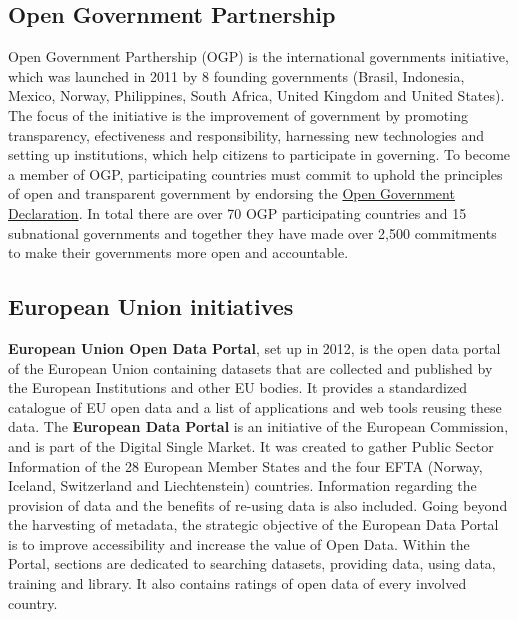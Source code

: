 \documentclass[thesis=B,english]{FITthesis}[2012/06/26]
\begin{document}
	\subsection{Open Government Partnership}
	Open Government Parthership (OGP) is the international governments initiative, which was launched in 2011 by 8 founding governments (Brasil, Indonesia, Mexico, Norway, Philippines, South Africa, United Kingdom and United States). The focus of the initiative is the improvement of government by promoting transparency, efectiveness and responsibility, harnessing new technologies and setting up institutions, which help citizens to participate in governing. To become a member of OGP, participating countries must commit to uphold the principles of open and transparent government by endorsing the \href{https://www.opengovpartnership.org/open-government-declaration}{Open Government Declaration}. In total there are over 70 OGP participating countries and 15 subnational governments and together they have made over 2,500 commitments to make their governments more open and accountable. \cite{opengovernmentpartnership}
	
	\subsection{European Union initiatives}
\textbf{European Union Open Data Portal}, set up in 2012, is the open data portal of the European Union containing datasets that are collected and published by the European Institutions and other EU bodies. It provides a standardized catalogue of EU open data and a list of applications and web tools reusing these data. \cite{EUopendataportal}
\hspace{10000px}
The \textbf{European Data Portal} is an initiative of the European Commission, and is part of the Digital Single Market. It was created to gather Public Sector Information of the 28 European Member States and the four EFTA (Norway, Iceland, Switzerland and Liechtenstein) countries. Information regarding the provision of data and the benefits of re-using data is also included. Going beyond the harvesting of metadata, the strategic objective of the European Data Portal is to improve accessibility and increase the value of Open Data. Within the Portal, sections are dedicated to searching datasets, providing data, using data, training and library. It also contains ratings of open data of every involved country. \cite{eudataportal}
\end{document}
